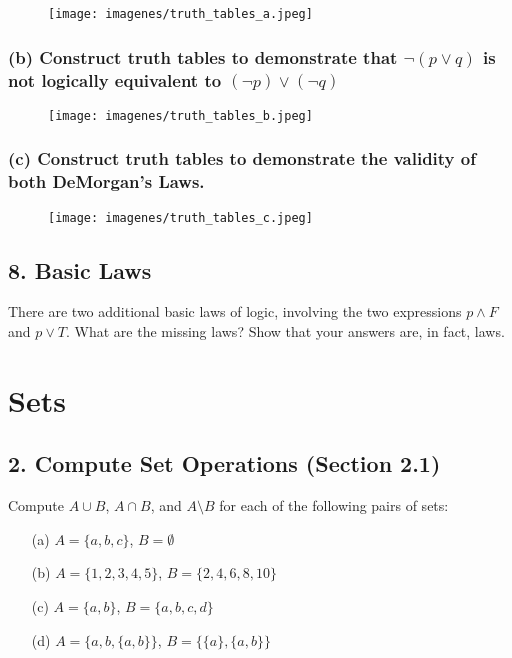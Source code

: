 \documentclass{article}
\begin{document}
\begin{figure}[H]
\centering
\texttt{[image: imagenes/truth\_tables\_a.jpeg]}
\end{figure}

\subsubsection*{(b) Construct truth tables to demonstrate that $\neg(p \lor q)$ is not logically equivalent to $(\neg p) \lor (\neg q)$}

\begin{figure}[H]
\centering
\texttt{[image: imagenes/truth\_tables\_b.jpeg]}
\end{figure}

\subsubsection*{(c) Construct truth tables to demonstrate the validity of both DeMorgan’s Laws.}

\begin{figure}[H]
\centering
\texttt{[image: imagenes/truth\_tables\_c.jpeg]}
\end{figure}


\subsection*{8. Basic Laws}
There are two additional basic laws of logic, involving the two expressions $p \land F$ and $p \lor T$. What are the missing laws? Show that your answers are, in fact, laws.



\section{Sets}

\subsection*{2. Compute Set Operations (Section 2.1)}

Compute $A \cup B$, $A \cap B$, and $A \setminus B$ for each of the following pairs of sets:

\begin{enumerate}
    \item[(a)] $A = \{a, b, c\}$, $B = \emptyset$
    \item[(b)] $A = \{1,2,3,4,5\}$, $B = \{2,4,6,8,10\}$
    \item[(c)] $A = \{a, b\}$, $B = \{a, b, c, d\}$
    \item[(d)] $A = \{a, b, \{a, b\}\}$, $B = \{\{a\}, \{a, b\}\}$
\end{enumerate}
\end{document}

